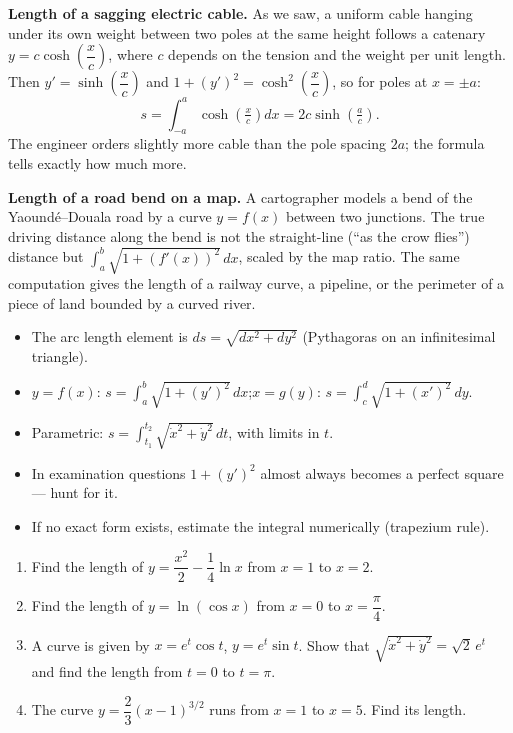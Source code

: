\documentclass[11pt]{article}
\newcounter{popsec}
\newcounter{popsub}
\newcommand{\courssub}[1]{%
  \stepcounter{popsub}%
  \par\vspace{9pt}\noindent{\popxbold\fontsize{11.5}{13}\selectfont\color{popink}{\color{poporange}\thepopsec.\thepopsub}\hspace{6pt}#1}\par\nopagebreak\vspace{4pt}
}
\begin{document}
\courssub{Applications}

\textbf{Length of a sagging electric cable.} As we saw, a uniform cable hanging under its own weight between two poles at the same height follows a catenary $y=c\cosh\!\left(\dfrac{x}{c}\right)$, where $c$ depends on the tension and the weight per unit length. Then $y'=\sinh\!\left(\dfrac{x}{c}\right)$ and $1+(y')^2=\cosh^2\!\left(\dfrac{x}{c}\right)$, so for poles at $x=\pm a$:
\[
s=\int_{-a}^{a}\cosh\!\left(\tfrac{x}{c}\right)dx=2c\sinh\!\left(\tfrac{a}{c}\right).
\]
The engineer orders slightly more cable than the pole spacing $2a$; the formula tells exactly how much more.

\textbf{Length of a road bend on a map.} A cartographer models a bend of the Yaoundé--Douala road by a curve $y=f(x)$ between two junctions. The true driving distance along the bend is not the straight-line (``as the crow flies'') distance but $\displaystyle\int_a^b\sqrt{1+(f'(x))^2}\,dx$, scaled by the map ratio. The same computation gives the length of a railway curve, a pipeline, or the perimeter of a piece of land bounded by a curved river.

\begin{aretenir}
\begin{itemize}
\item The arc length element is $ds=\sqrt{dx^2+dy^2}$ (Pythagoras on an infinitesimal triangle).
\item $y=f(x)$: $s=\displaystyle\int_a^b\sqrt{1+(y')^2}\,dx$;\quad $x=g(y)$: $s=\displaystyle\int_c^d\sqrt{1+(x')^2}\,dy$.
\item Parametric: $s=\displaystyle\int_{t_1}^{t_2}\sqrt{\dot x^2+\dot y^2}\,dt$, with limits in $t$.
\item In examination questions $1+(y')^2$ almost always becomes a perfect square — hunt for it.
\item If no exact form exists, estimate the integral numerically (trapezium rule).
\end{itemize}
\end{aretenir}

\begin{exercice}[Practice]
\begin{enumerate}
\item Find the length of $y=\dfrac{x^2}{2}-\dfrac14\ln x$ from $x=1$ to $x=2$.
\item Find the length of $y=\ln(\cos x)$ from $x=0$ to $x=\dfrac{\pi}{4}$.
\item A curve is given by $x=e^t\cos t$, $y=e^t\sin t$. Show that $\sqrt{\dot x^2+\dot y^2}=\sqrt2\,e^t$ and find the length from $t=0$ to $t=\pi$.
\item The curve $y=\dfrac{2}{3}(x-1)^{3/2}$ runs from $x=1$ to $x=5$. Find its length.
\end{enumerate}
\end{exercice}
\end{document}
